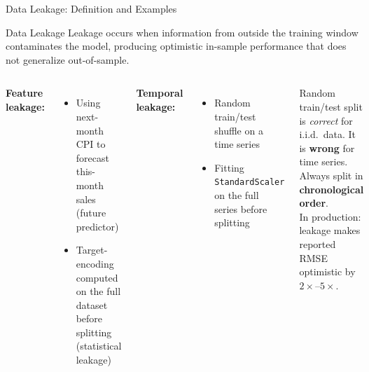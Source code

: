 \documentclass[aspectratio=169, 11pt]{beamer}
\begin{document}
\begin{frame}{Data Leakage: Definition and Examples}
  \begin{definitionbox}{Data Leakage}
    {\small Leakage occurs when information from outside the training
    window contaminates the model, producing optimistic in-sample
    performance that does not generalize out-of-sample.}
  \end{definitionbox}
  \begin{columns}[T]
      \textbf{Feature leakage:}
      \begin{itemize}\small
        \item Using next-month CPI to forecast this-month sales
              (future predictor)
        \item Target-encoding computed on the full dataset before
              splitting (statistical leakage)
      \end{itemize}
      \vspace{0.1cm}
      \textbf{Temporal leakage:}
      \begin{itemize}\small
        \item Random train/test shuffle on a time series
        \item Fitting \texttt{StandardScaler} on the full series
              before splitting
      \end{itemize}
      \begin{warningbox}
        {\small Random train/test split is \emph{correct}
        for i.i.d.\ data. It is \textbf{wrong} for time
        series. Always split in \textbf{chronological order}.\\[3pt]
        In production: leakage makes reported RMSE
        optimistic by $2\times$--$5\times$.}
      \end{warningbox}
  \end{columns}
\end{frame}
\end{document}
